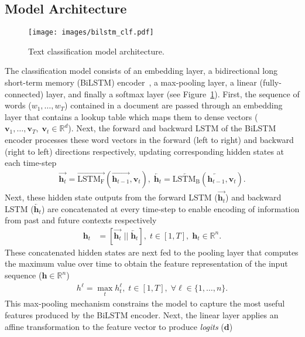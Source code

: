 \documentclass[letterpaper]{article}
\newcommand{\citep}{\cite}
\begin{document}
\subsection{Model Architecture}
\begin{figure}[t]
\centering
\texttt{[image: images/bilstm\_clf.pdf]}
\caption{Text classification model architecture.}
\label{fig:model}
\end{figure}

The classification model consists of an embedding layer, a bidirectional long short-term memory (BiLSTM) encoder~\citep{hochreiter1997long,schuster1997bidirectional}, a max-pooling layer, a linear (fully-connected) layer, and finally a softmax layer (see Figure~\ref{fig:model}). 
First, the sequence of words ($w_1, \ldots, w_{\textit{T}}$) contained in a document are passed through an embedding layer that contains a lookup table which maps them to dense vectors 
($\mathbf{v}_1,\ldots,\mathbf{v}_{\textit{T}},\;\mathbf{v}_t\in \mathbb{R}^d$). 
Next, the forward and backward LSTM of the BiLSTM encoder processes these word vectors in the forward (left to right) and backward (right to left) directions respectively, updating corresponding hidden states at each time-step
\begin{align*}
\overrightarrow{\mathbf{h}_t} = \overrightarrow{\mathrm{LSTM_F}}(\overrightarrow{\mathbf{h}_{t-1}}, \mathbf{v}_t),\;\overleftarrow{\mathbf{h}_t} = \overleftarrow{\mathrm{LSTM_B}}(\overleftarrow{\mathbf{h}_{t-1}}, \mathbf{v}_t).
\end{align*}
Next, these hidden state outputs from the forward LSTM ($\overrightarrow{\mathbf{h}_t}$) and backward LSTM ($\overleftarrow{\mathbf{h}_t}$) are concatenated at every time-step to enable encoding of information from past and future contexts respectively
\begin{align*}
\mathbf{h}_t &= [\overrightarrow{\mathbf{h}_t} \;||\;\overleftarrow{\mathbf{h}_t}],\;t \in [1, T],\;\mathbf{h}_t\in\mathbb{R}^n.
\end{align*}
These concatenated hidden states are next fed to the pooling layer that computes the maximum value over time to obtain the feature representation of the input sequence ($\mathbf{h} \in \mathbb{R}^n$) 
\begin{align*}
h^{\ell} = \max_{t} h^{\ell}_{t},\;t \in [1, T],\;\forall{\ell}\in\{1,\ldots,n\}.
\end{align*}
This max-pooling mechanism constrains the model to
capture the most useful features produced by the BiLSTM encoder. Next, the linear layer applies an affine transformation to the feature vector to produce \emph{logits} ($\mathbf{d}$)
\end{document}
